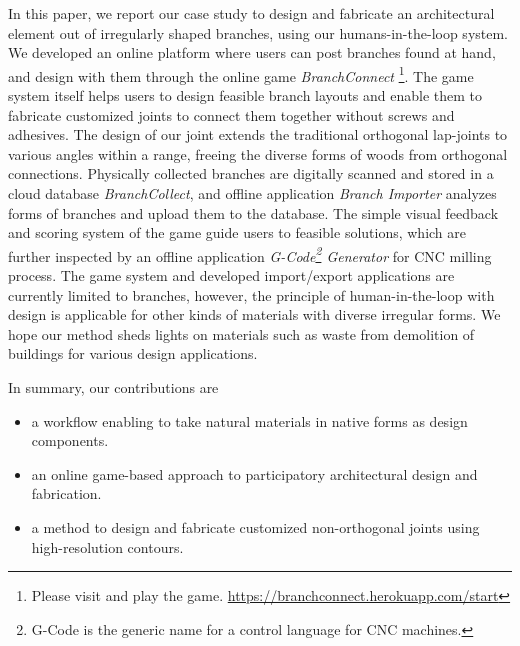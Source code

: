 In this paper, we report our case study to design and fabricate an architectural element out of irregularly shaped branches, using our humans-in-the-loop system.
We developed an online platform where users can post branches found at hand, and design with them through the online game \textit{BranchConnect} \footnote{Please visit and play the game. \url{https://branchconnect.herokuapp.com/start}}.
The game system itself helps users to design feasible branch layouts and enable them to fabricate customized joints to connect them together without screws and adhesives.
The design of our joint extends the traditional orthogonal lap-joints to various angles within a range, freeing the diverse forms of woods from orthogonal connections.
Physically collected branches are digitally scanned and stored in a cloud database \textit{BranchCollect}, and offline application \textit{Branch Importer} analyzes forms of branches and upload them to the database.
The simple visual feedback and scoring system of the game guide users to feasible solutions, which are further inspected by an offline application \textit{G-Code\footnote{G-Code is the generic name for a control language for CNC machines.} Generator} for CNC milling process.
The game system and developed import/export applications are currently limited to branches, however, the principle of human-in-the-loop with design is applicable for other kinds of materials with diverse irregular forms.
We hope our method sheds lights on materials such as waste from demolition of buildings for various design applications.


In summary, our contributions are
\begin{itemize}
 \item{a workflow enabling to take natural materials in native forms as design components.}
 \item{an online game-based approach to participatory architectural design and fabrication.}
 \item{a method to design and fabricate customized non-orthogonal joints using high-resolution contours.}
\end{itemize}




